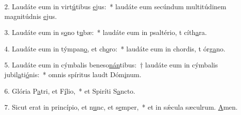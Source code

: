 2. Laudáte eum in virt\uline{ú}tibus \uline{e}jus:~* laudáte eum secúndum multitúdinem magnitúdnis \uline{e}jus.\par 
3. Laudáte eum in s\uline{o}no t\uline{u}bæ:~* laudáte eum in psaltério, t cíth\uline{a}ra.\par 
4. Laudáte eum in týmpan\uline{o}, et ch\uline{o}ro:~* laudáte eum in chordis, t órg\uline{a}no.\par 
5. Laudáte eum in cýmbalis beneso\uline{nán}tibus:~† laudáte eum in cýmbalis jubil\uline{a}ti\uline{ó}nis:~* omnis spíritus laudt Dóm\uline{i}num.\par 
6. Glória P\uline{a}tri, et F\uline{í}lio,~* et Spiríti S\uline{a}ncto.\par 
7. Sicut erat in princípio, et n\uline{u}nc, et s\uline{e}mper,~* et in sǽcula sæculrum. \uline{A}men.\par 
